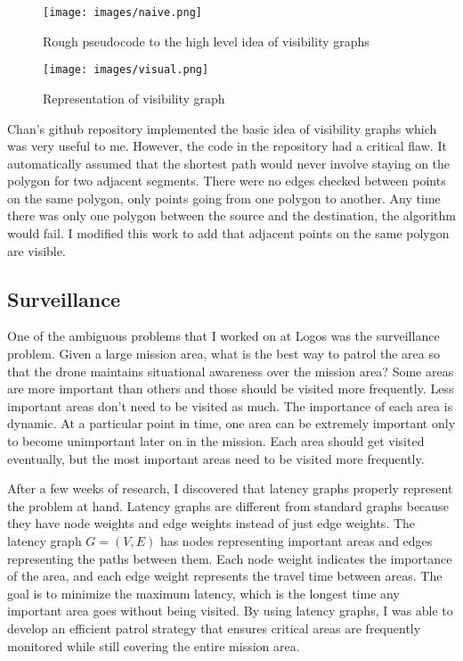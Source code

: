 \documentclass[12pt]{article}
\begin{document}
\begin{figure}[h]
    \centering
    \texttt{[image: images/naive.png]}
    \caption{Rough pseudocode to the high level idea of visibility graphs}
    \label{fig:code}
\end{figure}



\begin{figure}[h]
    \centering
    \texttt{[image: images/visual.png]}
    \caption{Representation of visibility graph}
    \label{fig:visual}
\end{figure}

Chan's github repository implemented the basic idea of visibility graphs which was very useful to me. \cite{chanMatthewachanVgraph2022} However, the code in the repository had a critical flaw. It automatically assumed that the shortest path would never involve staying on the polygon for two adjacent segments. There were no edges checked between points on the same polygon, only points going from one polygon to another. Any time there was only one polygon between the source and the destination, the algorithm would fail. I modified this work to add that adjacent points on the same polygon are visible.

\subsection{Surveillance}
One of the ambiguous problems that I worked on at Logos was the surveillance problem. Given a large mission area, what is the best way to patrol the area so that the drone maintains situational awareness over the mission area? Some areas are more important than others and those should be visited more frequently. Less important areas don't need to be visited as much. The importance of each area is dynamic. At a particular point in time, one area can be extremely important only to become unimportant later on in the mission. Each area should get visited eventually, but the most important areas need to be visited more frequently.

After a few weeks of research, I discovered that latency graphs properly represent the problem at hand. Latency graphs are different from standard graphs because they have node weights and edge weights instead of just edge weights. The latency graph $G = (V,E)$ has nodes representing important areas and edges representing the paths between them. Each node weight indicates the importance of the area, and each edge weight represents the travel time between areas. The goal is to minimize the maximum latency, which is the longest time any important area goes without being visited. By using latency graphs, I was able to develop an efficient patrol strategy that ensures critical areas are frequently monitored while still covering the entire mission area.
\end{document}

